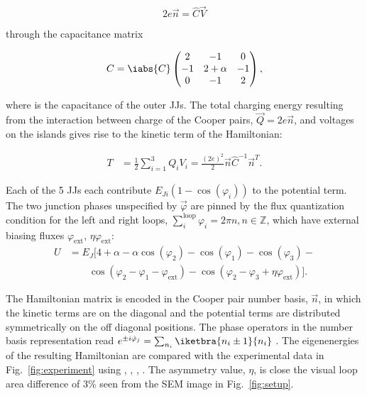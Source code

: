 \begin{equation}
  \label{eq:link}
  2e\vec{n} = \hat{C}\vec{V}
\end{equation}

\noindent through the capacitance matrix

\begin{equation}
  \label{eq:capac}
  C = \iabs{C} \begin{pmatrix}
    2  &  -1  &  0\\
    -1  &  2  +  \alpha  &  -1\\
    0  &  -1  & 2
  \end{pmatrix},
\end{equation}

\noindent where   is  the capacitance of  the outer
JJs.   The   total  charging  energy  resulting   from  the
interaction   between   charge   of   the   Cooper   pairs,
$ \vec{Q}=2e\vec{n}  $, and  voltages on the  islands gives
rise to the kinetic term of the Hamiltonian:

\begin{equation}\label{eq:kinetic}
  \begin{aligned}
    T     &     =     \frac{1}{2}\sum_{i=1}^{3}Q_iV_i     =
    \frac{(2e)^2}{2}\vec{n}\hat{C}^{-1}\vec{n}^{T}.
  \end{aligned}
\end{equation}


Each     of      the     5     JJs      each     contribute
$ E_{Ji}\left(1 - \cos(\varphi_i)\right) $ to the potential
term.    The    two   junction   phases    unspecified   by
$  \vec{\varphi}  $ are  pinned  by  the flux  quantization
condition    for     the    left    and     right    loops,
$  \sum_{i}^{\text{loop}}   \varphi_i  =  2\pi  n,   n  \in
\mathbb{Z}$,   which    have   external    biasing   fluxes
$ \varphi_\text{ext} $, $ \eta\varphi_\text{ext} $:
\begin{equation}\label{eq:potential}
  \begin{aligned}
    U & = E_J\big[4 + \alpha - \alpha\cos(\varphi_{2}) -\cos(\varphi_{1}) -\cos(\varphi_{3}) - \\
    &    \qquad    \cos(\varphi_{2}   -    \varphi_{1}    -
    \varphi_{\text{ext}}) -  \cos(\varphi_{2} - \varphi_{3}
    + \eta\varphi_{\text{ext}})\big].
  \end{aligned}
\end{equation}

The Hamiltonian matrix is encoded in the Cooper pair number
basis, $\vec{n}  $, in which  the kinetic terms are  on the
diagonal   and   the   potential  terms   are   distributed
symmetrically  on the  off diagonal  positions.  The  phase
operators   in  the   number   basis  representation   read
$           e^{\pm            i\hat{\varphi}_j}           =
\sum_{n_i}\iketbra{n_i\pm1}{n_i}$     \cite{phase}.     The
eigenenergies  of the  resulting  Hamiltonian are  compared
with  the  experimental data  in  Fig.~\ref{fig:experiment}
using  , ,
,  .   The
asymmetry value,  $ \eta $,  is close the visual  loop area
difference   of   3\%   seen   from  the   SEM   image   in
Fig.~\ref{fig:setup}.

